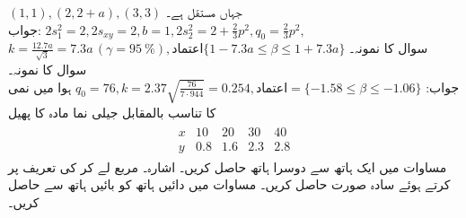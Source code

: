 \quad
$(1,1),(2,2+a),(3,3)$
جہاں  مستقل ہے۔\\
جواب:\quad
$2s_1^2=2, 2s_{xy}=2, b=1, 2s_2^2=2+\tfrac{2}{3}p^2,q_0=\tfrac{2}{3}p^2,$\\
$k=\tfrac{12.7a}{\sqrt{3}}=7.3a\, (\gamma=\SI{95}{\percent}), \text{اعتماد}\{1-7.3a\le \beta\le 1+7.3a\}$
\quad
سوال  کا نمونہ۔
\quad
سوال  کا نمونہ۔\\
جواب:\quad
$q_0=76,k=2.37\sqrt{\tfrac{76}{7\cdot 944}}=0.254, \text{اعتماد}=\{-1.58\le \beta\le -1.06\}$
\quad
ہوا میں نمی کا تناسب  بالمقابل جیلی نما مادہ  کا پھیل 
\begin{align*}
\begin{array}{c|cccc}
x&10&20&30&40\\
\hline
y&0.8&1.6&2.3&2.8
\end{array}
\end{align*}
\quad
مساوات  میں ایک ہاتھ سے دوسرا ہاتھ حاصل کریں۔ اشارہ۔ مربع لے کر  کی تعریف پر کرتے ہوئے سادہ صورت حاصل کریں۔
\quad
مساوات  میں  دائیں ہاتھ کو بائیں ہاتھ سے حاصل کریں۔
